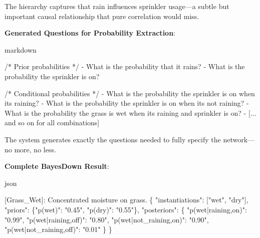 \documentclass[
  11pt,
  letterpaper,
]{book}
\newenvironment{Shaded}{\begin{snugshade}}{\end{snugshade}}
\newcommand{\CommentTok}[1]{\textcolor[rgb]{0.37,0.37,0.37}{#1}}
\newcommand{\DataTypeTok}[1]{\textcolor[rgb]{0.68,0.00,0.00}{#1}}
\newcommand{\ErrorTok}[1]{\textcolor[rgb]{0.68,0.00,0.00}{#1}}
\newcommand{\FunctionTok}[1]{\textcolor[rgb]{0.28,0.35,0.67}{#1}}
\newcommand{\NormalTok}[1]{\textcolor[rgb]{0.00,0.23,0.31}{#1}}
\newcommand{\OtherTok}[1]{\textcolor[rgb]{0.00,0.23,0.31}{#1}}
\newcommand{\SpecialStringTok}[1]{\textcolor[rgb]{0.13,0.47,0.30}{#1}}
\newcommand{\StringTok}[1]{\textcolor[rgb]{0.13,0.47,0.30}{#1}}
\begin{document}
The hierarchy captures that rain influences sprinkler usage---a subtle
but important causal relationship that pure correlation would miss.

\textbf{Generated Questions for Probability Extraction}:

markdown

\begin{Shaded}
\begin{Highlighting}[]
\NormalTok{/* Prior probabilities */}
\SpecialStringTok{{-} }\NormalTok{What is the probability that it rains?}
\SpecialStringTok{{-} }\NormalTok{What is the probability the sprinkler is on?}

\NormalTok{/* Conditional probabilities */  }
\SpecialStringTok{{-} }\NormalTok{What is the probability the sprinkler is on when it\textquotesingle{}s raining?}
\SpecialStringTok{{-} }\NormalTok{What is the probability the sprinkler is on when it\textquotesingle{}s not raining?}
\SpecialStringTok{{-} }\NormalTok{What is the probability the grass is wet when it\textquotesingle{}s raining and sprinkler is on?}
\SpecialStringTok{{-} }\CommentTok{[}\OtherTok{... and so on for all combinations}\CommentTok{]}
\end{Highlighting}
\end{Shaded}

The system generates exactly the questions needed to fully specify the
network---no more, no less.

\textbf{Complete BayesDown Result}:

json

\begin{Shaded}
\begin{Highlighting}[]
\OtherTok{[}\ErrorTok{Grass\_Wet}\OtherTok{]}\ErrorTok{:} \ErrorTok{Concentrated} \ErrorTok{moisture} \ErrorTok{on} \ErrorTok{grass.} \FunctionTok{\{}
  \DataTypeTok{"instantiations"}\FunctionTok{:} \OtherTok{[}\StringTok{"wet"}\OtherTok{,} \StringTok{"dry"}\OtherTok{]}\FunctionTok{,}
  \DataTypeTok{"priors"}\FunctionTok{:} \FunctionTok{\{}\DataTypeTok{"p(wet)"}\FunctionTok{:} \StringTok{"0.45"}\FunctionTok{,} \DataTypeTok{"p(dry)"}\FunctionTok{:} \StringTok{"0.55"}\FunctionTok{\},}
  \DataTypeTok{"posteriors"}\FunctionTok{:} \FunctionTok{\{}
    \DataTypeTok{"p(wet|raining,on)"}\FunctionTok{:} \StringTok{"0.99"}\FunctionTok{,}
    \DataTypeTok{"p(wet|raining,off)"}\FunctionTok{:} \StringTok{"0.80"}\FunctionTok{,} 
    \DataTypeTok{"p(wet|not\_raining,on)"}\FunctionTok{:} \StringTok{"0.90"}\FunctionTok{,}
    \DataTypeTok{"p(wet|not\_raining,off)"}\FunctionTok{:} \StringTok{"0.01"}
  \FunctionTok{\}}
\FunctionTok{\}}
\end{Highlighting}
\end{Shaded}
\end{document}
